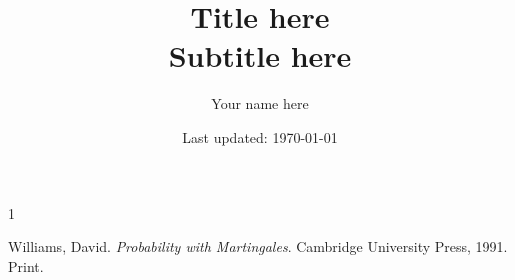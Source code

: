 \documentclass[letterpaper, 12pt]{article}
\newcommand{\1}{\mathds{1}}	%
\theoremstyle{definition}
\begin{document}

\title{Title here \\[1em]
\normalsize Subtitle here}


\author{\normalsize Your name here}
\date{\normalsize\vspace{-1ex} Last updated: \today}


\maketitle
\tableofcontents\label{sec:contents}






\begin{thebibliography}{1}

   Williams, David.
   \textit{Probability with Martingales}.
   Cambridge University Press, 1991.
   Print.


\end{thebibliography}

\end{document}

